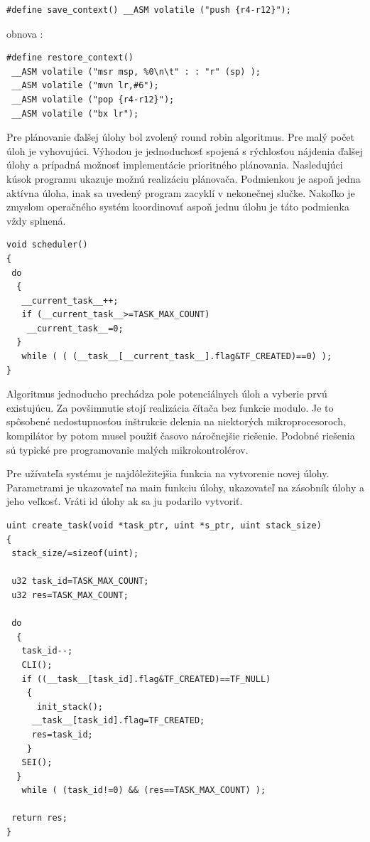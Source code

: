 \documentclass[twoside]{oss-conf}
\begin{document}
\begin{verbatim}
#define save_context() __ASM volatile ("push {r4-r12}");
\end{verbatim}
obnova : 
\begin{verbatim}
#define restore_context() 	 
 __ASM volatile ("msr msp, %0\n\t" : : "r" (sp) );
 __ASM volatile ("mvn lr,#6");
 __ASM volatile ("pop {r4-r12}");
 __ASM volatile ("bx lr");
\end{verbatim}


Pre plánovanie ďalšej úlohy bol zvolený round robin algoritmus. Pre malý počet úloh je vyhovujúci. Výhodou je jednoduchosť spojená s rýchlosťou nájdenia ďalšej úlohy a prípadná možnosť implementácie prioritného plánovania. Nasledujúci kúsok programu ukazuje
možnú realizáciu plánovača. Podmienkou je aspoň jedna aktívna úloha, inak sa uvedený program zacyklí v nekonečnej slučke.
Nakoľko je zmyslom operačného systém koordinovať aspoň jednu úlohu je táto podmienka vždy splnená.

\begin{verbatim}
void scheduler()
{
 do
  {
   __current_task__++;
   if (__current_task__>=TASK_MAX_COUNT)
    __current_task__=0;
  }
   while ( ( (__task__[__current_task__].flag&TF_CREATED)==0) );
}
\end{verbatim}

Algoritmus jednoducho prechádza pole potenciálnych úloh a vyberie prvú existujúcu. 
Za povšimnutie stojí realizácia čítača bez funkcie modulo. Je to spôsobené nedostupnosťou inštrukcie delenia na niektorých mikroprocesoroch, kompilátor by potom musel použiť časovo náročnejšie riešenie. Podobné riešenia sú typické pre programovanie malých
mikrokontrolérov.

Pre užívateľa systému je najdôležitejšia funkcia na vytvorenie novej úlohy. Parametrami je ukazovateľ na main funkciu úlohy,
ukazovateľ na zásobník úlohy a jeho veľkosť. Vráti id úlohy ak sa ju podarilo vytvoriť.
\begin{verbatim}
uint create_task(void *task_ptr, uint *s_ptr, uint stack_size)
{
 stack_size/=sizeof(uint);

 u32 task_id=TASK_MAX_COUNT;
 u32 res=TASK_MAX_COUNT;

 do
  {
   task_id--;
   CLI();
   if ((__task__[task_id].flag&TF_CREATED)==TF_NULL)
    {
      init_stack();
     __task__[task_id].flag=TF_CREATED;
     res=task_id;
    }
   SEI();
  }
   while ( (task_id!=0) && (res==TASK_MAX_COUNT) );

 return res;
}
\end{verbatim}
\end{document}
